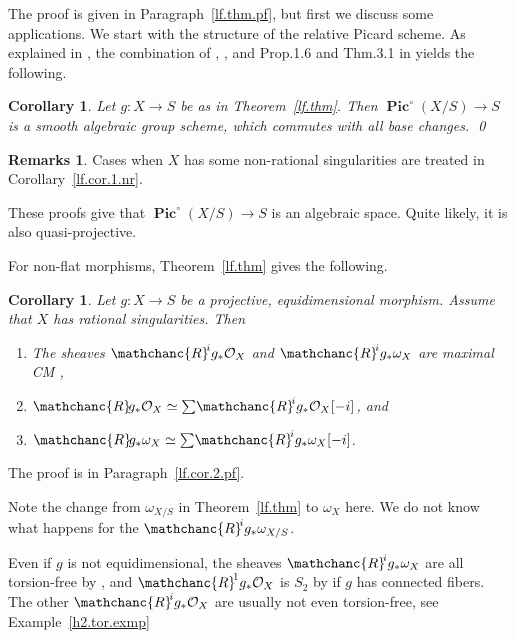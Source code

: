\documentclass{amsart}
\newtheorem{cor}[thm]{Corollary}
\theoremstyle{definition}
\newtheorem{rems}[thm]{Remarks}
\theoremstyle{remark}
\renewcommand{\o}[0]{{\mathcal O}}
\newcommand{\pics}[0]{\operatorname{\mathbf{Pic}}}
\newcommand{\tsum}[0]{\textstyle{\sum}}
\newcommand{\myR}{{\mathchanc{R}\!}}
\begin{document}
\medskip 
 
The proof is given in Paragraph~\ref{lf.thm.pf}, but first we discuss some applications. We start with the structure of the relative Picard scheme.
As explained in \cite[Sec.2.2]{kim2024neronmodelhigherdimensionallagrangian},
the combination of \cite[Thm.7.3]{Artin69b}, \cite[Thm.8.4.1]{blr},  and
Prop.1.6  and Thm.3.1 in \cite[Exp.VI$_B$]{sga3} yields the following.

 
   \begin{cor} \label{lf.cor.1}
    Let   $g:X\to S$ be as in Theorem~\ref{lf.thm}. Then
    $\pics^\circ(X/S)\to S$ is a smooth algebraic group scheme, which
    commutes with all base changes. \qed
    \end{cor}
    

   \begin{rems}
     Cases when $X$ has some non-rational singularities are treated in Corollary~\ref{lf.cor.1.nr}.

   These proofs give that $\pics^\circ(X/S)\to S$ is an algebraic space.
      Quite likely, it is also quasi-projective. 
    \end{rems}
    


      For non-flat morphisms, Theorem~\ref{lf.thm} gives the following.


 
  \begin{cor} \label{lf.cor.2} Let $g:X\to S$ be a projective, equidimensional morphism.
    Assume that $X$  has rational singularities.  Then
    \begin{enumerate}
    \item   The sheaves $\myR^ig_*\o_X$  and $\myR^ig_*\omega_X$ are maximal  CM \cite[\href{https://stacks.math.columbia.edu/tag/00NF}{Tag
00NF}]{stacks-project}, 
    \item $\myR g_*\o_X\simeq \tsum \myR^ig_*\o_X[-i]$, and 
    \item $\myR g_*\omega_{X}\simeq \tsum \myR^ig_*\omega_{X}[-i]$.
    \end{enumerate}
  \end{cor}

 
The proof is in  Paragraph~\ref{lf.cor.2.pf}.

  Note the change from  $\omega_{X/S}$ in Theorem~\ref{lf.thm} to $\omega_{X}$ here. We do not know what happens for
    the $\myR^ig_*\omega_{X/S}$.

    Even if $g$ is not equidimensional, the sheaves
    $\myR^ig_*\omega_X$ are all torsion-free by \cite[2.1]{k-hdi1},
     and $\myR^1g_*\o_X$  is $S_2$ 
    by \cite[7.8]{k-hdi1} if $g$ has  connected fibers.  The other  $\myR^ig_*\o_X$ are usually not even torsion-free, see Example~\ref{h2.tor.exmp}
    
\end{document}
